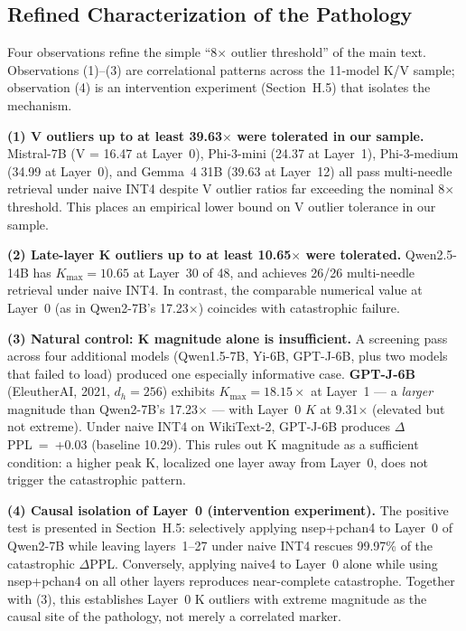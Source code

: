 \documentclass[11pt]{article}
\begin{document}
\subsection{Refined Characterization of the Pathology}

Four observations refine the simple ``8$\times$ outlier threshold'' of the main text. Observations (1)--(3) are correlational patterns across the 11-model K/V sample; observation (4) is an intervention experiment (Section~H.5) that isolates the mechanism.

\textbf{(1) V outliers up to at least 39.63$\times$ were tolerated in our sample.} Mistral-7B (V = 16.47 at Layer~0), Phi-3-mini (24.37 at Layer~1), Phi-3-medium (34.99 at Layer~0), and Gemma~4 31B (39.63 at Layer~12) all pass multi-needle retrieval under naive INT4 despite V outlier ratios far exceeding the nominal 8$\times$ threshold. This places an empirical lower bound on V outlier tolerance in our sample.

\textbf{(2) Late-layer K outliers up to at least 10.65$\times$ were tolerated.} Qwen2.5-14B has $K_{\max} = 10.65$ at Layer~30 of 48, and achieves 26/26 multi-needle retrieval under naive INT4. In contrast, the comparable numerical value at Layer~0 (as in Qwen2-7B's 17.23$\times$) coincides with catastrophic failure.

\textbf{(3) Natural control: K magnitude alone is insufficient.} A screening pass across four additional models (Qwen1.5-7B, Yi-6B, GPT-J-6B, plus two models that failed to load) produced one especially informative case. \textbf{GPT-J-6B} (EleutherAI, 2021, $d_h=256$) exhibits $K_{\max} = 18.15\times$ at Layer~1 --- a \emph{larger} magnitude than Qwen2-7B's 17.23$\times$ --- with Layer~0 $K$ at 9.31$\times$ (elevated but not extreme). Under naive INT4 on WikiText-2, GPT-J-6B produces $\Delta$PPL~=~+0.03 (baseline 10.29). This rules out K magnitude as a sufficient condition: a higher peak K, localized one layer away from Layer~0, does not trigger the catastrophic pattern.

\textbf{(4) Causal isolation of Layer~0 (intervention experiment).} The positive test is presented in Section~H.5: selectively applying nsep+pchan4 to Layer~0 of Qwen2-7B while leaving layers~1--27 under naive INT4 rescues 99.97\% of the catastrophic $\Delta$PPL. Conversely, applying naive4 to Layer~0 alone while using nsep+pchan4 on all other layers reproduces near-complete catastrophe. Together with (3), this establishes Layer~0 K outliers with extreme magnitude as the causal site of the pathology, not merely a correlated marker.
\end{document}
